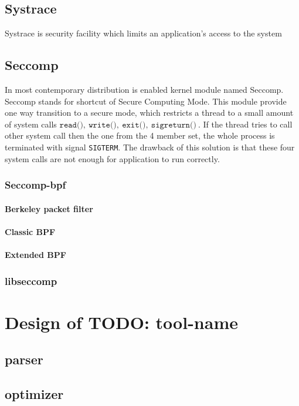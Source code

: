 \section{Systrace}
Systrace is security facility which limits an application's access to the system

\section{Seccomp}
In most contemporary distribution is enabled kernel module named Seccomp\cite{seccomp_sandbox}.
Seccomp stands for shortcut of Secure Computing Mode.
This module provide one way transition to a secure mode, which restricts a thread to a small amount of system calls \( \texttt{read()},\ \texttt{write()},\ \texttt{exit()},\ \texttt{sigreturn()}\ \).
If the thread tries to call other system call then the one from the 4 member set, the whole process is terminated with signal \texttt{SIGTERM}. 
The drawback of this solution is that these four system calls are not enough for application to run correctly.

\subsection{Seccomp-bpf}
\subsubsection{Berkeley packet filter}
\subsubsection{Classic BPF}
\subsubsection{Extended BPF}

\subsection{libseccomp}



\chapter{Design of TODO: tool-name}
\section{parser}
\section{optimizer}

